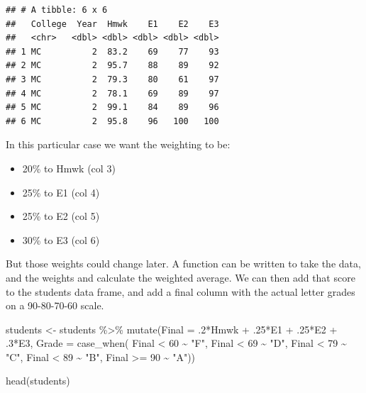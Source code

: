 \documentclass[
]{book}
\newenvironment{Shaded}{\begin{snugshade}}{\end{snugshade}}
\newcommand{\AttributeTok}[1]{\textcolor[rgb]{0.77,0.63,0.00}{#1}}
\newcommand{\DecValTok}[1]{\textcolor[rgb]{0.00,0.00,0.81}{#1}}
\newcommand{\FunctionTok}[1]{\textcolor[rgb]{0.00,0.00,0.00}{#1}}
\newcommand{\NormalTok}[1]{#1}
\newcommand{\OtherTok}[1]{\textcolor[rgb]{0.56,0.35,0.01}{#1}}
\newcommand{\SpecialCharTok}[1]{\textcolor[rgb]{0.00,0.00,0.00}{#1}}
\newcommand{\StringTok}[1]{\textcolor[rgb]{0.31,0.60,0.02}{#1}}
\providecommand{\tightlist}{%
  \setlength{\itemsep}{0pt}\setlength{\parskip}{0pt}}
\begin{document}
\begin{verbatim}
## # A tibble: 6 x 6
##   College  Year  Hmwk    E1    E2    E3
##   <chr>   <dbl> <dbl> <dbl> <dbl> <dbl>
## 1 MC          2  83.2    69    77    93
## 2 MC          2  95.7    88    89    92
## 3 MC          2  79.3    80    61    97
## 4 MC          2  78.1    69    89    97
## 5 MC          2  99.1    84    89    96
## 6 MC          2  95.8    96   100   100
\end{verbatim}

In this particular case we want the weighting to be:

\begin{itemize}
\tightlist
\item
  20\% to Hmwk (col 3)
\item
  25\% to E1 (col 4)
\item
  25\% to E2 (col 5)
\item
  30\% to E3 (col 6)
\end{itemize}

But those weights could change later. A function can be written to take the data, and the weights and calculate the weighted average. We can then add that score to the students data frame, and add a final column with the actual letter grades on a 90-80-70-60 scale.

\begin{Shaded}
\begin{Highlighting}[]
\NormalTok{students }\OtherTok{\textless{}{-}}\NormalTok{ students }\SpecialCharTok{\%\textgreater{}\%} 
  \FunctionTok{mutate}\NormalTok{(}\AttributeTok{Final =}\NormalTok{ .}\DecValTok{2}\SpecialCharTok{*}\NormalTok{Hmwk }\SpecialCharTok{+}\NormalTok{ .}\DecValTok{25}\SpecialCharTok{*}\NormalTok{E1 }\SpecialCharTok{+}\NormalTok{ .}\DecValTok{25}\SpecialCharTok{*}\NormalTok{E2 }\SpecialCharTok{+}\NormalTok{ .}\DecValTok{3}\SpecialCharTok{*}\NormalTok{E3,}
         \AttributeTok{Grade =} \FunctionTok{case\_when}\NormalTok{(}
\NormalTok{           Final }\SpecialCharTok{\textless{}} \DecValTok{60} \SpecialCharTok{\textasciitilde{}} \StringTok{"F"}\NormalTok{,}
\NormalTok{           Final }\SpecialCharTok{\textless{}} \DecValTok{69} \SpecialCharTok{\textasciitilde{}} \StringTok{"D"}\NormalTok{,}
\NormalTok{           Final }\SpecialCharTok{\textless{}} \DecValTok{79} \SpecialCharTok{\textasciitilde{}} \StringTok{"C"}\NormalTok{,}
\NormalTok{           Final }\SpecialCharTok{\textless{}} \DecValTok{89} \SpecialCharTok{\textasciitilde{}} \StringTok{"B"}\NormalTok{,}
\NormalTok{           Final }\SpecialCharTok{\textgreater{}=} \DecValTok{90} \SpecialCharTok{\textasciitilde{}} \StringTok{"A"}\NormalTok{))}

\FunctionTok{head}\NormalTok{(students)}
\end{Highlighting}
\end{Shaded}
\end{document}
